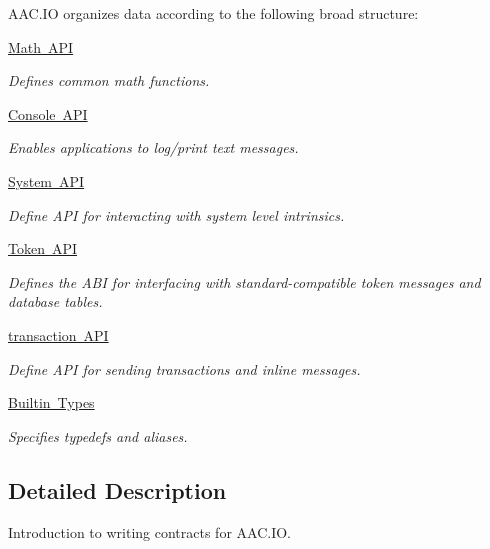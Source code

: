 \begin{DoxyCompactItemize}
\begin{DoxyCompactList}
A\+A\+C.\+IO organizes data according to the following broad structure\+: \end{DoxyCompactList}\item 
\mbox{\hyperlink{group__mathapi}{Math A\+PI}}
\begin{DoxyCompactList}\small\item\em Defines common math functions. \end{DoxyCompactList}\item 
\mbox{\hyperlink{group__consoleapi}{Console A\+PI}}
\begin{DoxyCompactList}\small\item\em Enables applications to log/print text messages. \end{DoxyCompactList}\item 
\mbox{\hyperlink{group__systemapi}{System A\+PI}}
\begin{DoxyCompactList}\small\item\em Define A\+PI for interacting with system level intrinsics. \end{DoxyCompactList}\item 
\mbox{\hyperlink{group__tokens}{Token A\+PI}}
\begin{DoxyCompactList}\small\item\em Defines the A\+BI for interfacing with standard-\/compatible token messages and database tables. \end{DoxyCompactList}\item 
\mbox{\hyperlink{group__transactionapi}{transaction A\+PI}}
\begin{DoxyCompactList}\small\item\em Define A\+PI for sending transactions and inline messages. \end{DoxyCompactList}\item 
\mbox{\hyperlink{group__types}{Builtin Types}}
\begin{DoxyCompactList}\small\item\em Specifies typedefs and aliases. \end{DoxyCompactList}\end{DoxyCompactItemize}


\subsection{Detailed Description}
Introduction to writing contracts for A\+A\+C.\+IO. 

